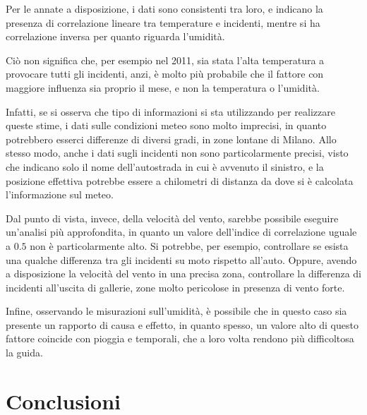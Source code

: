 \documentclass[a4paper,12pt]{report}
\begin{document}
Per le annate a disposizione, i dati sono consistenti tra loro, e indicano la presenza di 
correlazione lineare tra temperature e incidenti, mentre si ha correlazione inversa per quanto 
riguarda l'umidità.

Ciò non significa che, per esempio nel 2011, sia stata l'alta temperatura a provocare 
tutti gli incidenti, anzi, è molto più probabile che il fattore con maggiore 
influenza sia proprio il mese, e non la temperatura o l'umidità.

Infatti, se si osserva che tipo di informazioni si sta utilizzando per realizzare 
queste stime, i dati sulle condizioni meteo sono molto imprecisi, in quanto potrebbero 
esserci differenze di diversi gradi, in zone lontane di Milano.
Allo stesso modo, anche i dati sugli incidenti non sono particolarmente precisi, 
visto che indicano solo il nome dell'autostrada in cui è avvenuto 
il sinistro, e la posizione effettiva potrebbe essere a chilometri di distanza da dove 
si è calcolata l'informazione sul meteo.

Dal punto di vista, invece, della velocità del vento, sarebbe possibile eseguire 
un'analisi più approfondita, in quanto un valore dell'indice di correlazione uguale 
a $0.5$ non è particolarmente alto.
Si potrebbe, per esempio, controllare se esista una qualche differenza tra gli 
incidenti su moto rispetto all'auto. 
Oppure, avendo a disposizione la velocità del vento in una precisa zona, controllare 
la differenza di incidenti all'uscita di gallerie, zone molto pericolose 
in presenza di vento forte.

Infine, osservando le misurazioni sull'umidità, è possibile che in questo caso sia presente 
un rapporto di causa e effetto, in quanto spesso, un valore alto di questo fattore 
coincide con pioggia e temporali, che a loro volta rendono più difficoltosa la guida.


\chapter{Conclusioni}

\printbibliography
\end{document}
